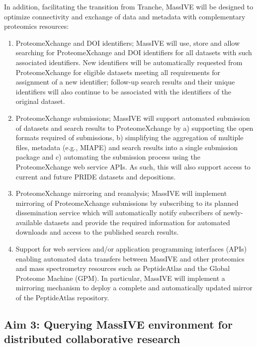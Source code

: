 \documentclass[arial,11pt]{article}
\begin{document}
In addition, facilitating the transition from Tranche, MassIVE will be designed to optimize connectivity and exchange of data and metadata with complementary proteomics resources:

\begin{enumerate}
\item ProteomeXchange and DOI identifiers; MassIVE will use, store and allow searching for ProteomeXchange and DOI identifiers for all datasets with such associated identifiers. New identifiers will be automatically requested from ProteomeXchange for eligible datasets meeting all requirements for assignment of a new identifier; follow-up search results and their unique identifiers will also continue to be associated with the identifiers of the original dataset.

\item ProteomeXchange  submissions; MassIVE will support automated submission of datasets and search results to ProteomeXchange by a) supporting the open formats required of submissions, b) simplifying the aggregation of multiple files, metadata (e.g., MIAPE) and search results into a single submission package and c) automating the submission process using the ProteomeXchange web service APIs. As such, this will also support access to current and future PRIDE datasets and depositions.

\item ProteomeXchange mirroring and reanalysis; MassIVE will implement mirroring of ProteomeXchange submissions by subscribing to its planned dissemination service which will automatically notify subscribers of newly-available datasets and provide the required information for automated downloads and access to the published search results.

\item Support for web services and/or application programming interfaces (APIs) enabling automated data transfers between MassIVE and other proteomics and mass spectrometry resources such as PeptideAtlas and the Global Proteome Machine (GPM). In particular, MassIVE will implement a mirroring mechanism to deploy a complete and automatically updated mirror of the PeptideAtlas repository.
\end{enumerate}


\subsection{Aim 3: Querying MassIVE environment for distributed collaborative research}
\end{document}
